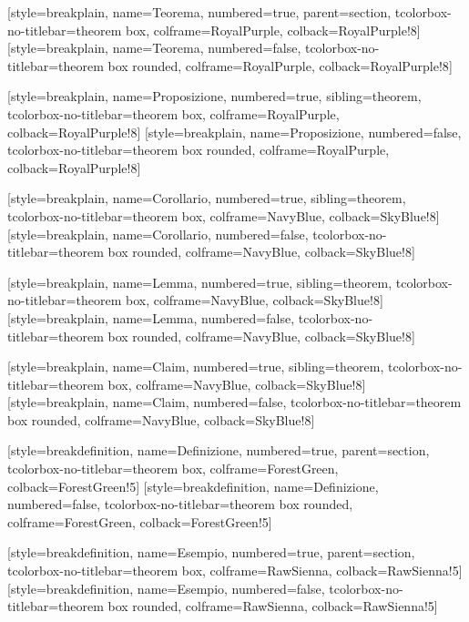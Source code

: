 
[style=breakplain, name=Teorema, numbered=true, parent=section,
    tcolorbox-no-titlebar={theorem box, colframe=RoyalPurple, colback=RoyalPurple!8}]
[style=breakplain, name=Teorema, numbered=false,
    tcolorbox-no-titlebar={theorem box rounded, colframe=RoyalPurple, colback=RoyalPurple!8}]

[style=breakplain, name=Proposizione, numbered=true, sibling=theorem,
    tcolorbox-no-titlebar={theorem box, colframe=RoyalPurple, colback=RoyalPurple!8}]
[style=breakplain, name=Proposizione, numbered=false,
    tcolorbox-no-titlebar={theorem box rounded, colframe=RoyalPurple, colback=RoyalPurple!8}]

[style=breakplain, name=Corollario, numbered=true, sibling=theorem,
    tcolorbox-no-titlebar={theorem box, colframe=NavyBlue, colback=SkyBlue!8}]
[style=breakplain, name=Corollario, numbered=false,
    tcolorbox-no-titlebar={theorem box rounded, colframe=NavyBlue, colback=SkyBlue!8}]

[style=breakplain, name=Lemma, numbered=true, sibling=theorem,
    tcolorbox-no-titlebar={theorem box, colframe=NavyBlue, colback=SkyBlue!8}]
[style=breakplain, name=Lemma, numbered=false,
    tcolorbox-no-titlebar={theorem box rounded, colframe=NavyBlue, colback=SkyBlue!8}]

[style=breakplain, name=Claim, numbered=true, sibling=theorem,
    tcolorbox-no-titlebar={theorem box, colframe=NavyBlue, colback=SkyBlue!8}]
[style=breakplain, name=Claim, numbered=false,
    tcolorbox-no-titlebar={theorem box rounded, colframe=NavyBlue, colback=SkyBlue!8}]

[style=breakdefinition, name=Definizione, numbered=true, parent=section,
    tcolorbox-no-titlebar={theorem box, colframe=ForestGreen, colback=ForestGreen!5}]
[style=breakdefinition, name=Definizione, numbered=false,
    tcolorbox-no-titlebar={theorem box rounded, colframe=ForestGreen, colback=ForestGreen!5}]

[style=breakdefinition, name=Esempio, numbered=true, parent=section,
    tcolorbox-no-titlebar={theorem box, colframe=RawSienna, colback=RawSienna!5}]
[style=breakdefinition, name=Esempio, numbered=false,
    tcolorbox-no-titlebar={theorem box rounded, colframe=RawSienna, colback=RawSienna!5}]

